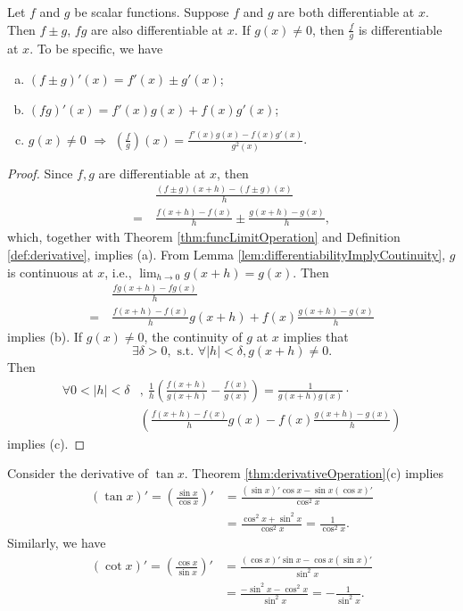 \begin{thm}
  \label{thm:derivativeOperation}
  Let $f$ and $g$ be scalar functions. Suppose $f$ and $g$
  are both differentiable at $x$. Then $f\pm g$, $fg$ are also
  differentiable at $x$. If $g(x)\neq 0$, then $\frac{f}{g}$ is
  differentiable at $x$. To be specific, we have
  \begin{enumerate}[(a)]
  \item $(f\pm g)'(x)=f'(x)\pm g'(x)$;
  \item $(fg)'(x)=f'(x)g(x)+f(x)g'(x)$;
  \item $g(x)\neq 0$ $\Rightarrow$
    $(\frac{f}{g})(x)=\frac{f'(x)g(x)-f(x)g'(x)}{g^{2}(x)}$.
  \end{enumerate}
\end{thm}
\begin{proof}
  Since $f,g$ are differentiable at $x$, then
  \begin{align*}
    &\ \frac{(f\pm g)(x+h)-(f\pm g)(x)}{h}\\
    =&\ \frac{f(x+h)-f(x)}{h}\pm \frac{g(x+h)-g(x)}{h},
  \end{align*}
  which, together with
  Theorem \ref{thm:funcLimitOperation} and Definition \ref{def:derivative},
  implies (a). From Lemma \ref{lem:differentiabilityImplyCoutinuity},
  $g$ is continuous at $x$, i.e., $\lim_{h\to 0}g(x+h)=g(x)$. Then
  \begin{align*}
    &\ \frac{fg(x+h)-fg(x)}{h}\\
    =&\ \frac{f(x+h)-f(x)}{h}g(x+h)+f(x)\frac{g(x+h)-g(x)}{h}
  \end{align*}
  implies (b).
  If $g(x)\neq 0$, the continuity of $g$ at $x$ implies that
  \begin{displaymath}
    \exists \delta>0,\text{ s.t. } \forall |h|<\delta, g(x+h)\neq 0.
  \end{displaymath}
  Then
  \begin{align*}
    \forall 0<|h|<\delta&,\ 
    \frac{1}{h} \left( \frac{f(x+h)}{g(x+h)}
    -\frac{f(x)}{g(x)} \right)
    = \frac{1}{g(x+h)g(x)}\cdot\\
    &\left( \frac{f(x+h)-f(x)}{h}g(x)
    -f(x)\frac{g(x+h)-g(x)}{h}\right)
  \end{align*}
  implies (c).
\end{proof}

\begin{exm}
  \label{exm:derivativeOfTangentAndCotangent}
  Consider the derivative of $\tan x$.
  Theorem \ref{thm:derivativeOperation}(c) implies
  \begin{align*}
    (\tan x)'= \left( \frac{\sin x}{\cos x}  \right)'
    &=\frac{(\sin x)'\cos x-\sin x(\cos x)'}{\cos^{2}x}\\
    &=\frac{\cos^{2} x+\sin^{2} x }{\cos^{2} x}
      =\frac{1}{\cos^{2} x}.
  \end{align*}
  Similarly, we have
  \begin{align*}
    (\cot x)'= \left( \frac{\cos x}{\sin x}  \right)'
    &=\frac{(\cos x)'\sin x-\cos x(\sin x)'}{\sin^{2}x}\\
    &=\frac{-\sin^{2} x-\cos^{2} x }{\sin^{2} x}
      =-\frac{1}{\sin^{2} x}.
  \end{align*}
\end{exm}

